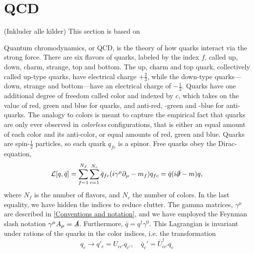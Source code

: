 \section{QCD}
\label{section:QCD}
(Inkluder alle kilder) This section is based on~\cite{Peskin:IntroQFT,Schwartz:QFT}

Quantum chromodynamics, or QCD, is the theory of how quarks interact via the strong force.
There are six flavors of quarks, labeled by the index $f$, called up, down, charm, strange, top and bottom.
The up, charm and top quark, collectively called up-type quarks, have electrical charge $+\frac{2}{3}$, while the down-type quarks---down, strange and bottom---have an electrical charge of $-\frac{1}{3}$.
Quarks have one additional degree of freedom called color and indexed by $c$, which takes on the value of red, green and blue for quarks, and anti-red, -green and -blue for anti-quarks.
The analogy to colors is meant to capture the empirical fact that quarks are only ever observed in \emph{colorless} configurations, that is either an equal amount of each color and its anti-color, or equal amounts of red, green and blue.
Quarks are spin-$\frac{1}{2}$ particles, so each quark $q_{fc}$ is a spinor.
Free quarks obey the Dirac-equation,
\begin{equation}
    \mathcal{L}[q, \bar q] = \sum_{f=1}^{N_f} \sum_{c = 1}^{N_c} \bar q_{fc} (i\gamma^\mu \partial_\mu - m_f )q_{fc}
    = \bar q (i\slashed{\partial } - m)q,
\end{equation}
where $N_f$ is the number of flavors, and $N_c$ the number of colors.
In the last equality, we have hidden the indices to reduce clutter.
The gamma matrices, $\gamma^\mu$ are described in \autoref{Conventions and notation}, and we have employed the Feynman slash notation $\gamma^\mu A_\mu = \slashed A$.
Furthermore, $\bar q = q^\dagger \gamma^0$.
This Lagrangian is invariant under rations of the quarks in the color indices, i.e. the transformation
\begin{equation}
    q_c \rightarrow q'_c = U_{cc'} q_{c'},
    \quad 
    \bar q_c' = \bar U_{cc'}^\dagger q_c
\end{equation}
